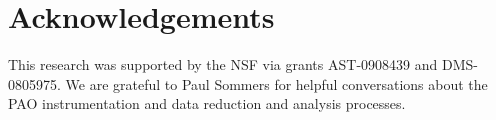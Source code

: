 \documentclass[dvips,aoas,preprint]{imsart}
\begin{document}


%
%
%
%
%


\section*{Acknowledgements}
This research was supported by the NSF via grants AST-0908439 and DMS-0805975.
We are grateful to Paul Sommers for helpful conversations about the
PAO instrumentation and data reduction and analysis processes.


\begin{supplement}[id=supp]
\end{supplement}



\newcommand{\apj}{Astrophysical Journal}
\newcommand{\apjl}{Astrophysical Journal Letters}
\newcommand{\mnras}{Monthly Notices of the Royal Astronomical Society}
\newcommand{\jcap}{Journal of Cosmology and Astroparticle Physics}



\end{document}
